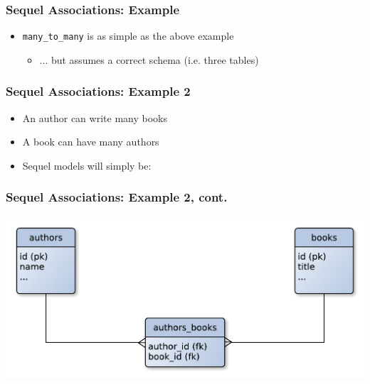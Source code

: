 \documentclass{beamer}
\begin{document}
\begin{frame}[fragile]\frametitle{Sequel Associations: Example} 
  
  
  
  
    
  \begin{itemize}

    \item \texttt{many\_to\_many} is as simple as the above example
    \begin{itemize}
      \item ... but assumes a correct schema (i.e. three tables)
    \end{itemize}

  \end{itemize}

\end{frame}




\begin{frame}[fragile]\frametitle{Sequel Associations: Example 2} 

  \begin{itemize}

    \item An author can write many books
    \item A book can have many authors
    \item Sequel models will simply be:

  \end{itemize}  
  
  
  
  
    
\end{frame}



\begin{frame}[fragile]\frametitle{Sequel Associations: Example 2, cont.} 

  \begin{center}
    \includegraphics[scale=0.5]{diagrams/authors_books_tables.pdf}  
  \end{center}
      
\end{frame}
\end{document}
